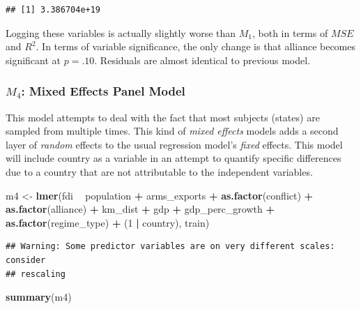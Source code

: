 \documentclass[11pt,]{article}
\newenvironment{Shaded}{\begin{snugshade}}{\end{snugshade}}
\newcommand{\DecValTok}[1]{\textcolor[rgb]{0.00,0.00,0.81}{#1}}
\newcommand{\KeywordTok}[1]{\textcolor[rgb]{0.13,0.29,0.53}{\textbf{#1}}}
\newcommand{\NormalTok}[1]{#1}
\newcommand{\OperatorTok}[1]{\textcolor[rgb]{0.81,0.36,0.00}{\textbf{#1}}}
\newcommand{\StringTok}[1]{\textcolor[rgb]{0.31,0.60,0.02}{#1}}
\begin{document}
\begin{verbatim}
## [1] 3.386704e+19
\end{verbatim}

Logging these variables is actually slightly worse than \(M_1\), both in
terms of \(MSE\) and \(R^2\). In terms of variable significance, the
only change is that alliance becomes significant at \(p = .10\).
Residuals are almost identical to previous model.

\hypertarget{m_4-mixed-effects-panel-model}{%
\subsubsection{\texorpdfstring{\(M_4\): Mixed Effects Panel
Model}{M\_4: Mixed Effects Panel Model}}\label{m_4-mixed-effects-panel-model}}

This model attempts to deal with the fact that most subjects (states)
are sampled from multiple times. This kind of \emph{mixed effects}
models adds a second layer of \emph{random} effects to the usual
regression model's \emph{fixed} effects. This model will include country
as a variable in an attempt to quantify specific differences due to a
country that are not attributable to the independent variables.

\begin{Shaded}
\begin{Highlighting}[]
\NormalTok{m4 <-}\StringTok{ }\KeywordTok{lmer}\NormalTok{(fdi }\OperatorTok{~}\StringTok{ }\NormalTok{population }\OperatorTok{+}\StringTok{ }\NormalTok{arms_exports }\OperatorTok{+}\StringTok{ }\KeywordTok{as.factor}\NormalTok{(conflict) }\OperatorTok{+}\StringTok{ }
\StringTok{                 }\KeywordTok{as.factor}\NormalTok{(alliance) }\OperatorTok{+}\StringTok{ }\NormalTok{km_dist }\OperatorTok{+}\StringTok{ }\NormalTok{gdp }\OperatorTok{+}\StringTok{ }\NormalTok{gdp_perc_growth }\OperatorTok{+}
\StringTok{                 }\KeywordTok{as.factor}\NormalTok{(regime_type) }\OperatorTok{+}\StringTok{ }\NormalTok{(}\DecValTok{1} \OperatorTok{|}\StringTok{ }\NormalTok{country), train)}
\end{Highlighting}
\end{Shaded}

\begin{verbatim}
## Warning: Some predictor variables are on very different scales: consider
## rescaling
\end{verbatim}

\begin{Shaded}
\begin{Highlighting}[]
\KeywordTok{summary}\NormalTok{(m4)}
\end{Highlighting}
\end{Shaded}
\end{document}
